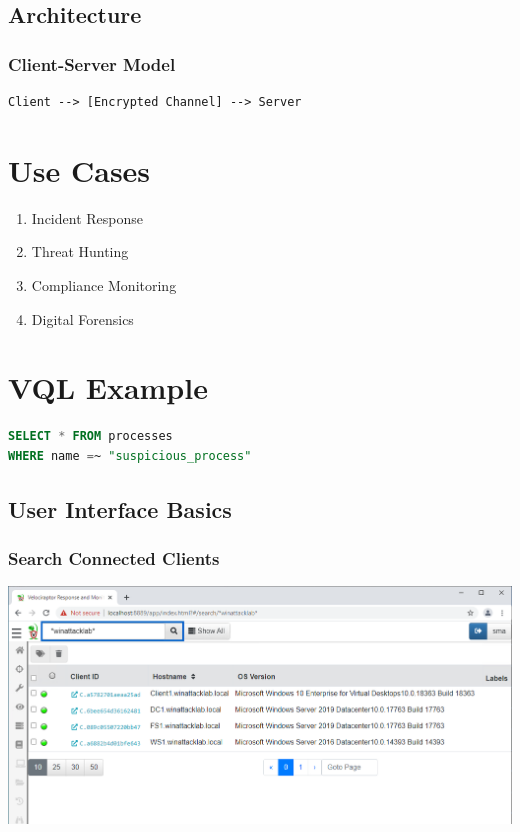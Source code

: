 \subsection{Architecture}
\subsubsection{Client-Server Model}
\begin{verbatim}
Client --> [Encrypted Channel] --> Server
\end{verbatim}

\section{Use Cases}
\begin{enumerate}
    \item Incident Response
    \item Threat Hunting
    \item Compliance Monitoring
    \item Digital Forensics
\end{enumerate}

\section{VQL Example}
\begin{lstlisting}[language=SQL]
SELECT * FROM processes 
WHERE name =~ "suspicious_process"
\end{lstlisting}


\subsection{User Interface Basics}

\subsubsection*{Search Connected Clients}
\includegraphics[width=\textwidth]{resources/06-velociraptor-interface-01.png}

